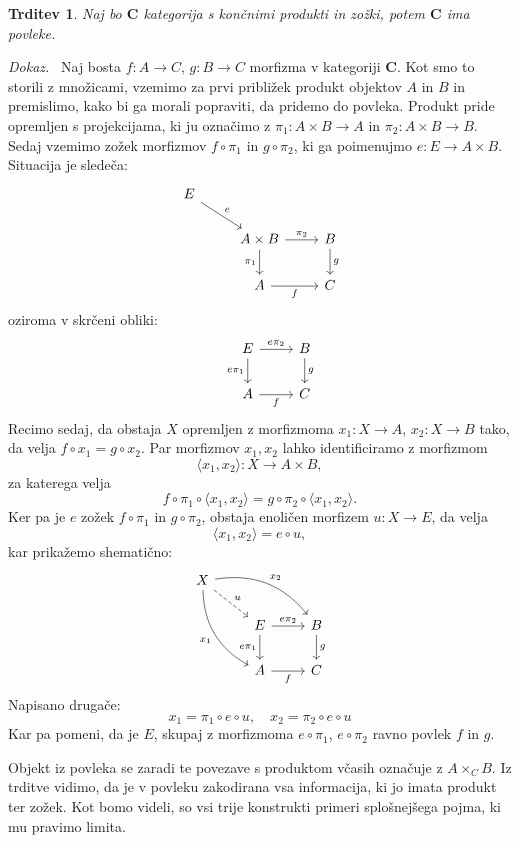 \documentclass[12pt,a4paper]{book}
\theoremstyle{definition}
\theoremstyle{plain}
\newtheorem{trditev}[definicija]{Trditev}
\newenvironment{dokaz}{\emph{Dokaz.}\ }{\hspace{\fill}{$\Box$}}
\theoremstyle{definition}
\theoremstyle{remark}
\newcommand{\cat}[1]{\textbf{#1}}
\newcommand{\fprod}[1]{\langle #1 \rangle}
\begin{document}
\begin{trditev}
Naj bo $\cat{C}$ kategorija s končnimi produkti in zožki, potem $\cat{C}$ ima povleke.
\end{trditev}
\begin{dokaz}
Naj bosta $f : A \to C$, $g : B \to C$ morfizma v kategoriji $\cat{C}$. Kot smo to storili z množicami, vzemimo za prvi približek produkt objektov $A$ in $B$ in premislimo, kako bi ga morali popraviti, da pridemo do povleka. Produkt pride opremljen s projekcijama, ki ju označimo z $\pi_1 : A \times B \to A$ in $\pi_2 : A \times B \to B$. Sedaj vzemimo zožek morfizmov $f \circ \pi_1$ in $g \circ \pi_2$, ki ga poimenujmo $e : E \to A \times B$. Situacija je sledeča:
%
$$\begin{tikzcd}
E
\ar[dr, "e"] \\
& A \times B \arrow[r, "\pi_2"] \arrow[d, "\pi_1"']
& B \arrow[d, "g"] \\
& A \arrow[r, "f"']
& C
\end{tikzcd}$$
oziroma v skrčeni obliki:
%
$$\begin{tikzcd}
& E \arrow[r, "e\pi_2"] \arrow[d, "e\pi_1"']
& B \arrow[d, "g"] \\
& A \arrow[r, "f"']
& C
\end{tikzcd}$$
Recimo sedaj, da obstaja $X$ opremljen z morfizmoma $x_1 : X \to A$, $x_2 : X \to B$ tako, da velja $f \circ x_1 = g \circ x_2$. Par morfizmov $x_1,x_2$ lahko identificiramo z morfizmom
$$\langle x_1,x_2 \rangle : X \to A \times B,$$
za katerega velja
$$f \circ \pi_1 \circ \fprod{x_1,x_2} = g \circ \pi_2 \circ \fprod{x_1,x_2}.$$
Ker pa je $e$ zožek $f \circ \pi_1$ in $g \circ \pi_2$, obstaja enoličen morfizem $u : X \to E$, da velja 
$$\fprod{x_1,x_2} = e \circ u,$$
kar prikažemo shematično:
%
$$\begin{tikzcd}
X \ar[ddr, bend right, "x_1"'] \ar[drr, bend left, "x_2"] \ar[dr, dashed, "u"] \\
& E \arrow[r, "e\pi_2"] \arrow[d, "e\pi_1"']
& B \arrow[d, "g"] \\
& A \arrow[r, "f"']
& C
\end{tikzcd}$$
%
Napisano drugače:
$$x_1 = \pi_1 \circ e \circ u, \quad x_2 = \pi_2 \circ e \circ u$$
Kar pa pomeni, da je $E$, skupaj z morfizmoma $e \circ \pi_1$, $e \circ \pi_2$ ravno povlek $f$ in $g$.
\end{dokaz}

Objekt iz povleka se zaradi te povezave s produktom včasih označuje z $A \times_C B$.
Iz trditve vidimo, da je v povleku zakodirana vsa informacija, ki jo imata produkt ter zožek. Kot bomo videli, so vsi trije konstrukti primeri splošnejšega pojma, ki mu pravimo limita.
\end{document}
